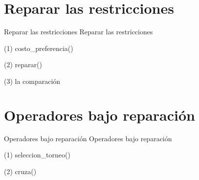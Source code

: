 
\section{Reparar las restricciones}

\begin{frame}{Reparar las restricciones}
Reparar las restricciones
\end{frame}

\begin{frame}[fragile]{(1) costo\_preferencia()}

\end{frame}

\begin{frame}[fragile]{(2) reparar()}

\end{frame}

\begin{frame}[fragile]{(3) la comparación}

\end{frame}


\section{Operadores bajo reparación}

\begin{frame}{Operadores bajo reparación}
Operadores bajo reparación
\end{frame}

\begin{frame}[fragile]{(1) seleccion\_torneo()}

\end{frame}

\begin{frame}[fragile]{(2) cruza()}

\end{frame}

